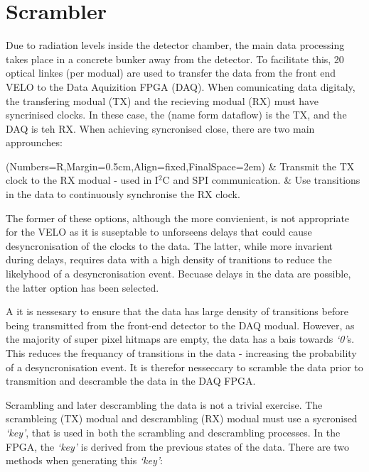 \section{Scrambler}
\label{sec:scrambling_algorithms}

	Due to radiation levels inside the detector chamber, the main data processing takes place in a concrete bunker away from the detector.
	To facilitate this, 20 optical linkes (per modual) are used to transfer the data from the front end VELO to the Data Aquizition FPGA (DAQ).
	When comunicating data digitaly, the transfering modual (TX) and the recieving modual (RX) must have syncrinised clocks.
	In these case, the (name form dataflow) is the TX, and the DAQ is teh RX.
	When achieving syncronised close, there are two main approunches:

	\begin{easylist}
		\ListProperties(Numbers=R,Margin=0.5cm,Align=fixed,FinalSpace=2em)
		& Transmit the TX clock to the RX modual - used in I$^2$C and SPI communication.
		& Use transitions in the data to continuously synchronise the RX clock.
	\end{easylist}

	The former of these options, although the more convienient, is not appropriate for the VELO as it is suseptable to unforseens delays that could cause desyncronisation of the clocks to the data.
	The latter, while more invarient during delays, requires data with a high density of tranitions to reduce the likelyhood of a desyncronisation event.
	Becuase delays in the data are possible, the latter option has been selected.

	A it is nessesary to ensure that the data has large density of transitions before being transmitted from the front-end detector to the DAQ modual.
	However, as the majority of super pixel hitmaps are empty, the data has a bais towards \textit{`0'}s.
	This reduces the frequancy of transitions in the data - increasing the probability of a desyncronisation event.
	It is therefor nesseccary to scramble the data prior to transmition and descramble the data in the DAQ FPGA.
	\par
	Scrambling and later descrambling the data is not a trivial exercise.
	The scrambleing (TX) modual and descrambling (RX) modual must use a sycronised \textit{`key'}, that is used in both the scrambling and descrambling processes.
	In the FPGA, the \textit{`key'} is derived from the previous states of the data.
	There are two methods when generating this \textit{`key'}:

